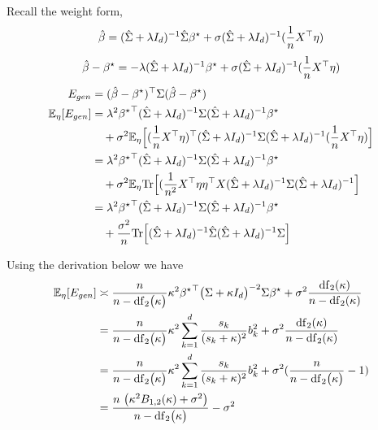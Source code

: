 Recall the weight form,
\[
\hat{\beta}=(\hat{\Sigma}+\lambda I_{d})^{-1}\hat{\Sigma}{\beta^{\star}}+\sigma(\hat{\Sigma}+\lambda I_{d})^{-1}(\frac{1}{n}X^{\top}\eta)
\]
\[
\hat{\beta}-{\beta^{\star}}=-\lambda(\hat{\Sigma}+\lambda I_{d})^{-1}{\beta^{\star}}+\sigma(\hat{\Sigma}+\lambda I_{d})^{-1}(\frac{1}{n}X^{\top}\eta)
\]
\begin{align*}
E_{gen} & =(\hat{\beta}-{\beta^{\star}})^{\top}\Sigma(\hat{\beta}-{\beta^{\star}})\\
\mathbb{E}_{\eta}[E_{gen}] & =\lambda^{2}{{\beta^{\star}}}^{\top}(\hat{\Sigma}+\lambda I_{d})^{-1}\Sigma(\hat{\Sigma}+\lambda I_{d})^{-1}{\beta^{\star}}\\
 & \quad+\sigma^{2}\mathbb{E}_{\eta}\Big[(\frac{1}{n}X^{\top}\eta)^{\top}(\hat{\Sigma}+\lambda I_{d})^{-1}\Sigma(\hat{\Sigma}+\lambda I_{d})^{-1}(\frac{1}{n}X^{\top}\eta)\Big]\\
 & =\lambda^{2}{{\beta^{\star}}}^{\top}(\hat{\Sigma}+\lambda I_{d})^{-1}\Sigma(\hat{\Sigma}+\lambda I_{d})^{-1}{\beta^{\star}}\\
 & \quad+\sigma^{2}\mathbb{E}_{\eta}\mathrm{Tr}\Big[(\frac{1}{n^{2}}X^{\top}\eta\eta^{\top}X(\hat{\Sigma}+\lambda I_{d})^{-1}\Sigma(\hat{\Sigma}+\lambda I_{d})^{-1}\Big]\\
 & =\lambda^{2}{{\beta^{\star}}}^{\top}(\hat{\Sigma}+\lambda I_{d})^{-1}\Sigma(\hat{\Sigma}+\lambda I_{d})^{-1}{\beta^{\star}}\\
 & \quad+\frac{\sigma^{2}}{n}\mathrm{Tr}\Big[(\hat{\Sigma}+\lambda I_{d})^{-1}\hat{\Sigma}(\hat{\Sigma}+\lambda I_{d})^{-1}\Sigma\Big]
\end{align*}

Using the derivation below we have
\begin{align}
\mathbb{E}_{\eta}[E_{gen}] & \asymp\frac{n}{n-\mathrm{df}_{2}\bigl(\kappa\bigr)}\kappa^{2}{\bstar}^{\top}\bigl(\Sigma+\kappa I_{d}\bigr)^{-2}\Sigma\bstar+\sigma^{2}\frac{\mathrm{df}_{2}(\kappa)}{n-\mathrm{df}_{2}(\kappa)}\nonumber \\
 & =\frac{n}{n-\mathrm{df}_{2}\bigl(\kappa\bigr)}\kappa^{2}\sum_{k=1}^{d}\frac{s_{k}}{(s_{k}+\kappa)^{2}}b_{k}^{2}+\sigma^{2}\frac{\mathrm{df}_{2}(\kappa)}{n-\mathrm{df}_{2}(\kappa)}\nonumber \\
 & =\frac{n}{n-\mathrm{df}_{2}\bigl(\kappa\bigr)}\kappa^{2}\sum_{k=1}^{d}\frac{s_{k}}{(s_{k}+\kappa)^{2}}b_{k}^{2}+\sigma^{2}(\frac{n}{n-\mathrm{df}_{2}\bigl(\kappa\bigr)}-1)\label{eq:generalization_error_classic}\\
 & =\frac{n\ \big(\kappa^{2}B_{1,2}(\kappa)+\sigma^{2}\big)}{n-\mathrm{df}_{2}\bigl(\kappa\bigr)}-\sigma^{2}\label{eq:generalization_error_classic_abbrev}
\end{align}

